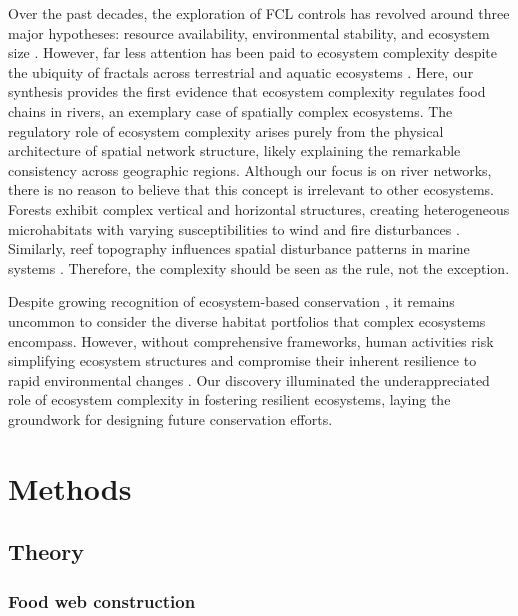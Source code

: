 \documentclass[11pt, class=article, crop=false]{standalone}
\begin{document}
Over the past decades, the exploration of FCL controls has revolved around three major hypotheses: resource availability, environmental stability, and ecosystem size \citep{oksanen_exploitation_1981, pimm_number_1977, schoener_food_1989}.
However, far less attention has been paid to ecosystem complexity despite the ubiquity of fractals across terrestrial \citep{turner_landscape_2015} and aquatic ecosystems \citep{rodriguez-iturbe_fractal_2001}.
Here, our synthesis provides the first evidence that ecosystem complexity regulates food chains in rivers, an exemplary case of spatially complex ecosystems.
The regulatory role of ecosystem complexity arises purely from the physical architecture of spatial network structure, likely explaining the remarkable consistency across geographic regions.
Although our focus is on river networks, there is no reason to believe that this concept is irrelevant to other ecosystems.
Forests exhibit complex vertical and horizontal structures, creating heterogeneous microhabitats with varying susceptibilities to wind and fire disturbances \citep{peterson_contagious_2002, cansler_climate_2014}.
Similarly, reef topography influences spatial disturbance patterns in marine systems \citep{connell_30year_1997}.
Therefore, the complexity should be seen as the rule, not the exception.

Despite growing recognition of ecosystem-based conservation \citep{schindler_portfolio_2015}, it remains uncommon to consider the diverse habitat portfolios that complex ecosystems encompass.
However, without comprehensive frameworks, human activities risk simplifying ecosystem structures \citep{turner_landscape_2015, grill_mapping_2019} and compromise their inherent resilience to rapid environmental changes \citep{turner_landscape_2015}.
Our discovery illuminated the underappreciated role of ecosystem complexity in fostering resilient ecosystems, laying the groundwork for designing future conservation efforts.

\newpage

\section{Methods}

\subsection{Theory}

\subsubsection{Food web construction}
\end{document}

